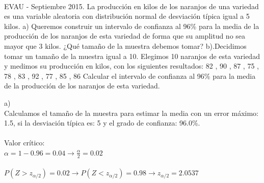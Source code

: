 \documentclass[spanish, 11pt]{exam}
\begin{document}
\begin{questions}
\begin{solution}
 \\
       \end{solution}\question EVAU - Septiembre 2015. La producción en kilos de los naranjos de una variedad es una variable
aleatoria con distribución normal de desviación típica igual a 5 kilos.
a) Queremos construir un intervalo de confianza al 96\% para la media de la producción de los
naranjos de esta variedad de forma que su amplitud no sea mayor que 3 kilos. ¿Qué tamaño de la muestra
debemos
tomar? b).Decidimos tomar un tamaño de la muestra igual a 10. Elegimos 10 naranjos de esta
variedad y medimos su producción en kilos, con los siguientes resultados:
82 , 90 , 87 , 75 , 78 , 83 , 92 , 77 , 85 , 86
Calcular el intervalo de confianza al 96\% para la media de la producción de los naranjos de esta variedad. \begin{solution}   a) \\Calculamos el tamaño de la muestra para estimar la media con un error máximo: 1.5, si la desviación típica es: 5 y el grado de confianza: 96.0\%. \\ \\ Valor crítico: \\ $\alpha=1-0.96=0.04\to \frac{\alpha}{2}=0.02$ \\ \\ $P(Z>z_{\alpha/2})=0.02\to P(Z<z_{\alpha/2})=0.98 \to z_{\alpha/2} =2.0537$ \\ 
\end{solution}
\end{questions}
\end{document}
